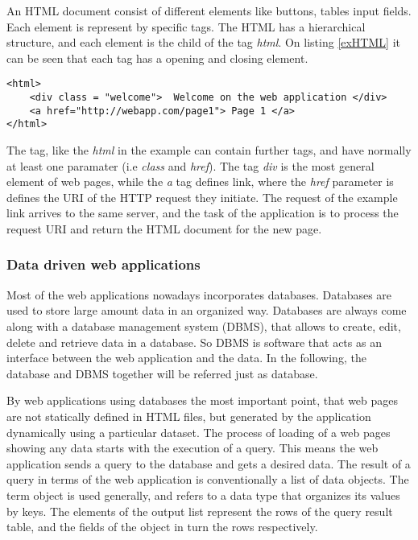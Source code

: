 

An HTML document consist of different elements like buttons, tables input fields. Each element is represent by specific tags. The HTML has a hierarchical structure, and each element is the child of the tag \textit{html}. On listing \ref{exHTML} it can be seen that each tag has a opening and closing element. 

\begin{lstlisting}[captionpos=b, caption=Example HTML document, label=exHTML, belowskip=1em, aboveskip=2em,
basicstyle=\footnotesize,frame=single]
<html>
	<div class = "welcome">  Welcome on the web application </div>
	<a href="http://webapp.com/page1"> Page 1 </a>
</html>
\end{lstlisting}

The tag, like the \textit{html} in the example can contain further tags, and have normally at least one paramater (i.e \textit{class} and \textit{href}). The tag \textit{div} is the most general element of web pages, while the \textit{a} tag defines link, where the \textit{href} parameter is defines the URI of the HTTP request they initiate. The request of the example link arrives to the same server, and the task of the application is to process the request URI and return the HTML document for the new page. 


\subsubsection{Data driven web applications} \label{dataDriven}

Most of the web applications nowadays incorporates databases. Databases are used to store large amount data in an organized way. Databases are always come along with a database management system (DBMS), that allows to create, edit, delete and retrieve data in a database. So DBMS is software that acts as an interface between the web application and the data. In the following, the database and DBMS together will be referred just as database.  

By web applications using databases the most important point, that web pages are not statically defined in HTML files, but generated by the application dynamically using a particular dataset. The process of loading of a web pages showing any data starts with the execution of a query. This means the web application sends a query to the database and gets a desired data. The result of a query in terms of the web application is conventionally a list of data objects.  The term object is used generally, and refers to a data type that organizes its values by keys. The elements of the output list represent the rows of the query result table, and the fields of the object in turn the rows respectively. 

